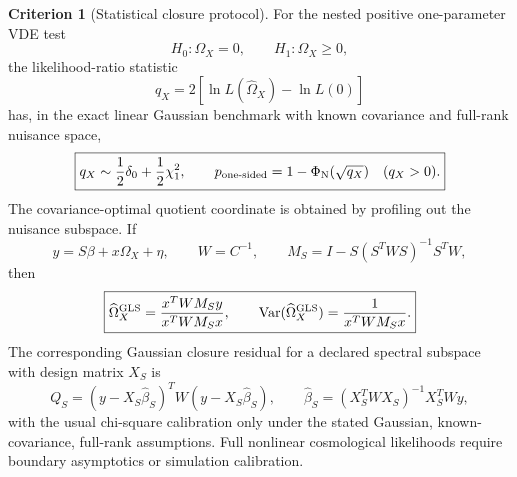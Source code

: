 \documentclass[11pt,a4paper]{article}
\numberwithin{equation}{section}
\theoremstyle{definition}
\newtheorem{criterion}{Criterion}
\theoremstyle{plain}
\theoremstyle{remark}
\begin{document}
\begin{criterion}[Statistical closure protocol]
For the nested positive one-parameter VDE test
\begin{equation}
H_0:\Omega_X=0,
\qquad
H_1:\Omega_X\ge0,
\end{equation}
the likelihood-ratio statistic
\begin{equation}
q_X=2\left[\ln L(\widehat\Omega_X)-\ln L(0)\right]
\end{equation}
has, in the exact linear Gaussian benchmark with known covariance and full-rank nuisance space,
\begin{equation}
\boxed{
q_X\sim\frac12\delta_0+\frac12\chi_1^2,
\qquad
p_{\rm one\text{-}sided}=1-\Phi_{\rm N}(\sqrt{q_X})\quad(q_X>0).
}
\end{equation}
The covariance-optimal quotient coordinate is obtained by profiling out the nuisance subspace.  If
\begin{equation}
y=S\beta+x\Omega_X+\eta,
\qquad
W=C^{-1},
\qquad
M_S=I-S(S^TWS)^{-1}S^TW,
\end{equation}
then
\begin{equation}
\boxed{
\widehat\Omega_X^{\rm GLS}=
\frac{x^TWM_Sy}{x^TWM_Sx},
\qquad
\operatorname{Var}(\widehat\Omega_X^{\rm GLS})=
\frac{1}{x^TWM_Sx}.
}
\end{equation}
The corresponding Gaussian closure residual for a declared spectral subspace with design matrix \(X_S\) is
\begin{equation}
\boxed{
Q_S=(y-X_S\widehat\beta_S)^TW(y-X_S\widehat\beta_S),
\qquad
\widehat\beta_S=(X_S^TWX_S)^{-1}X_S^TWy,
}
\end{equation}
with the usual chi-square calibration only under the stated Gaussian, known-covariance, full-rank assumptions.  Full nonlinear cosmological likelihoods require boundary asymptotics or simulation calibration.
\end{criterion}
\end{document}
